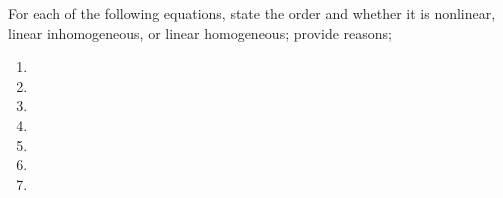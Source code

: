 For each of the following equations, state the order and whether it is nonlinear, linear inhomogeneous, or linear homogeneous; provide reasons;

\begin{enumerate}
\item 
\item \vspace{.2in}
\item 
\item \vspace{.2in}
\item \vspace{.2in}
\item \vspace{.2in}
\item 
\end{enumerate}
